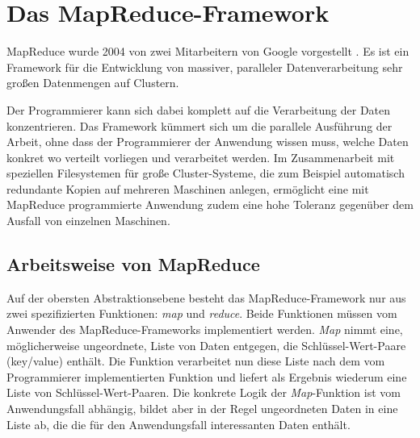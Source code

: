 \section{Das MapReduce-Framework}
MapReduce wurde 2004 von zwei Mitarbeitern von Google vorgestellt \cite{dean2008mapreduce}. Es ist ein Framework
für die Entwicklung von massiver, paralleler Datenverarbeitung sehr großen Datenmengen auf Clustern.



Der Programmierer
kann sich dabei komplett auf die Verarbeitung der Daten konzentrieren. Das Framework kümmert sich um die parallele
Ausführung der Arbeit, ohne dass der Programmierer der Anwendung wissen muss, welche Daten konkret wo verteilt vorliegen
und verarbeitet werden. 
Im Zusammenarbeit mit speziellen Filesystemen 
für große Cluster-Systeme, die zum Beispiel automatisch redundante Kopien auf mehreren Maschinen anlegen, ermöglicht
eine mit MapReduce programmierte Anwendung zudem eine hohe Toleranz gegenüber dem Ausfall von einzelnen Maschinen.

\subsection{Arbeitsweise von MapReduce}
Auf der obersten Abstraktionsebene besteht das MapReduce-Framework nur aus zwei spezifizierten Funktionen: \textit{map} und \textit{reduce}.
Beide Funktionen müssen vom Anwender des MapReduce-Frameworks implementiert werden.
\textit{Map} nimmt eine, möglicherweise ungeordnete, Liste von Daten entgegen, die Schlüssel-Wert-Paare (key/value) enthält. Die Funktion 
verarbeitet nun diese Liste nach dem vom Programmierer implementierten Funktion und liefert als Ergebnis wiederum eine
Liste von Schlüssel-Wert-Paaren. Die konkrete Logik der \textit{Map}-Funktion ist vom Anwendungsfall abhängig, bildet aber in der Regel
ungeordneten Daten in eine Liste ab, die die für den Anwendungsfall interessanten Daten enthält. 



